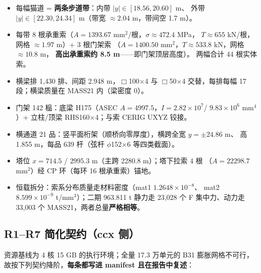 \documentclass[11pt,a4paper]{ctexart}
\begin{document}
\begin{itemize}
  \item 每幅猫道 = \textbf{两条步道带}：内带 $|y|\in[18.56,20.60]$ m、
        外带 $|y|\in[22.30,24.34]$ m（带宽 $\approx 2.04$ m，带间空 1.7 m）。
  \item 每带 8 根承重索（$A=1393.67$ mm$^2$/根，$\sigma\approx472.4$ MPa，
        $T\approx655$ kN/根，网格 $\approx1.97$ m）+ 3 根门架索
        （$A=1400.50$ mm$^2$，$T\approx533.8$ kN，网格 $\approx10.8$ m，
        \textbf{高出承重索约 8.5 m}——即门架顶层高度）。
        两幅合计 44 根实体索。
  \item 横梁排 1{,}430 排、间距 2.948 m，$\Box$100$\times$4 与 $\Box$50$\times$4
        交替，每排每幅 17 段；横梁质量在 MASS21 内（梁密度 0）。
  \item 门架 142 榀：底梁 H175（ASEC $A{=}4997.5$，$I{=}2.82{\times}10^7$/
        $9.83\times10^6$ mm$^4$）+ 立柱/顶梁 RHS160$\times$4；与索 CERIG UXYZ 铰接。
  \item 横通道 21 品：竖平面桁架（顺桥向零厚度），横跨全宽 $y=\pm24.86$ m、
        高 1.855 m，每品 639 杆（弦杆 $\phi$152$\times$6 等四类截面）。
  \item 塔位 $x=714.5$ / $2995.3$ m（主跨 2280.8 m）；塔下拉索 4 根
        （$A=22298.7$ mm$^2$）经 CP 环（每环 16 根承重索）锚地。
  \item 恒载拆分：索系分布质量走材料密度（mat1 $1.2648\times10^{-8}$、
        mat2 $8.599\times10^{-9}$ t/mm$^3$）；二期 963.811 t 静力走 23{,}028 个
        F 集中力、动力走 33{,}003 个 MASS21，两者总量\textbf{严格相等}。
\end{itemize}

\subsection{R1--R7 简化契约（ccx 侧）}

资源基线为 4 核 15 GB 的执行环境；全量 17.3 万单元的 B31 膨胀网格不可行，
故按下列契约降阶，\textbf{每条都写进 manifest 且在报告中复述}：
\end{document}

